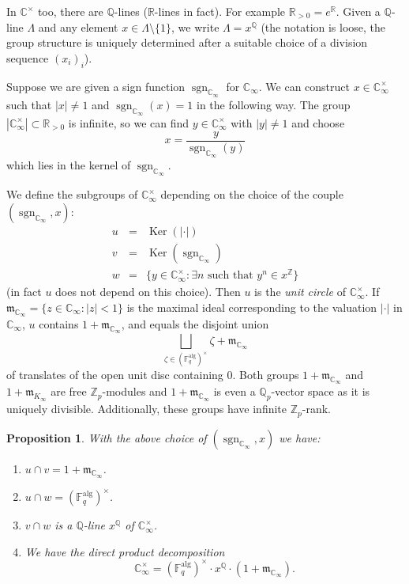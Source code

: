 \documentclass[11pt]{amsart}
\numberwithin{equation}{section}
\newcommand{\ZZ}{\mathbb{Z}}
\newcommand{\FF}{\mathbb{F}}
\newcommand{\CC}{\mathbb{C}}
\newcommand{\QQ}{\mathbb{Q}}
\newcommand{\RR}{\mathbb{R}}
\newcommand{\sgn}{\operatorname{sgn}}
\newtheorem{Proposition}[Theorem]{Proposition}
\begin{document}
 
In $\CC^\times$ too, there are $\QQ$-lines ($\RR$-lines in fact). For example $\RR_{>0}=e^\RR$. 
Given a $\QQ$-line $\Lambda$ and any element $x\in\Lambda\setminus\{1\}$, we write $\Lambda=x^\QQ$ (the notation is loose,  the group structure is uniquely determined after a suitable choice of a division sequence $(x_i)_i$).

Suppose we are given a sign function $\sgn_{\CC_\infty}$ for $\CC_\infty$. We can construct $x\in\CC_\infty^\times$ such that $|x|\neq1$ and $\sgn_{\CC_\infty}(x)=1$ in the following way. The group $|\CC_\infty^\times|\subset\RR_{>0}$ is infinite, so we can find $y\in \CC_\infty^\times$ with $|y|\neq1$ and choose
$$x=\frac{y}{\sgn_{\CC_\infty}(y)}$$
which lies in the kernel of $\sgn_{\CC_\infty}$.

We define the subgroups of $\CC_\infty^\times$ depending on the choice of the couple $(\sgn_{\CC_\infty},x)$:
\begin{eqnarray*}
u&=&\operatorname{Ker}(|\cdot|)\\
v&=&\operatorname{Ker}(\sgn_{\CC_\infty})\\
w&=&\{y\in\CC_\infty^\times:\exists n\text{ such that }y^n\in x^\ZZ\}
\end{eqnarray*}
(in fact $u$ does not depend on this choice).
Then $u$ is the {\em unit circle} of $\CC_\infty^\times$. If $\mathfrak{m}_{\CC_\infty}=\{z\in\CC_\infty:|z|<1\}$ is the maximal ideal corresponding to the valuation $|\cdot|$ in $\CC_\infty$, $u$ contains $1+\mathfrak{m}_{\CC_\infty}$, and equals the disjoint union 
\begin{equation}\label{union-gm}
\bigsqcup_{\zeta\in(\FF_q^{\text{alg}})^\times}\zeta+\mathfrak{m}_{\CC_\infty}
\end{equation}
 of translates of the open unit disc containing $0$. Both groups $1+\mathfrak{m}_{\CC_\infty}$ and $1+\mathfrak{m}_{K_\infty}$ are free $\ZZ_p$-modules and $1+\mathfrak{m}_{\CC_\infty}$ is even a $\QQ_p$-vector space as it is uniquely divisible. Additionally, these groups have infinite $\ZZ_p$-rank.
 
\begin{Proposition}\label{proposition-uvw}
With the above choice of $(\sgn_{\CC_\infty},x)$ we have:
\begin{enumerate}
\item $u\cap v=1+\mathfrak{m}_{\CC_\infty}$.
\item $u\cap w=(\FF^{\text{alg}}_q)^\times$.
\item $v\cap w$ is a $\QQ$-line $x^\QQ$ of $\CC_\infty^\times$.
\item We have
the direct product decomposition
\begin{equation}\label{decomposition-C-infty}
\CC_\infty^\times=(\FF_q^{\text{alg}})^{\times}\cdot x^\QQ\cdot (1+\mathfrak{m}_{\CC_\infty}).
\end{equation} 
\end{enumerate}
\end{Proposition}
\end{document}
